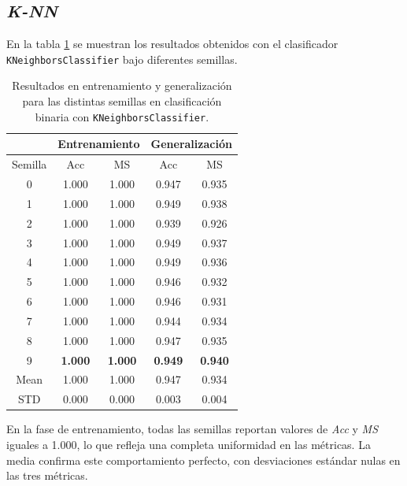 \subsection{\textit{K-NN}}
\label{subsec:knn_bin}

En la tabla \ref{tabla:knn_bin} se muestran los resultados obtenidos con el clasificador \texttt{KNeighborsClassifier} bajo diferentes semillas.

\begin{table}[H]
	\centering
	\begin{tabular}{ |c|c|c|c|c| }
		\hline
		\rowcolor{LightCyan}
		 & \multicolumn{2}{c|}{Entrenamiento} & \multicolumn{2}{c|}{Generalización} \\
		\hline
		\rowcolor{LightCyan}
		 Semilla & Acc & MS & Acc & MS \\
		\hline
		0    & 1.000          & 1.000          & 0.947          & 0.935          \\
		1    & 1.000          & 1.000          & 0.949          & 0.938          \\
		2    & 1.000          & 1.000          & 0.939          & 0.926          \\
		3    & 1.000          & 1.000          & 0.949          & 0.937          \\
		4    & 1.000          & 1.000          & 0.949          & 0.936          \\
		5    & 1.000          & 1.000          & 0.946          & 0.932          \\
		6    & 1.000          & 1.000          & 0.946          & 0.931          \\
		7    & 1.000          & 1.000          & 0.944          & 0.934          \\
		8    & 1.000          & 1.000          & 0.947          & 0.935          \\
		9    & \textbf{1.000} & \textbf{1.000} & \textbf{0.949} & \textbf{0.940} \\
		Mean & 1.000          & 1.000          & 0.947          & 0.934          \\
		STD  & 0.000          & 0.000          & 0.003          & 0.004          \\
		\hline
	\end{tabular}
	\caption{Resultados en entrenamiento y generalización para las distintas semillas en clasificación binaria con \texttt{KNeighborsClassifier}.}
	\label{tabla:knn_bin}
\end{table}

En la fase de entrenamiento, todas las semillas reportan valores de \textit{Acc} y \textit{MS} iguales a 1.000, lo que refleja una completa uniformidad en las métricas. La media confirma este comportamiento perfecto, con desviaciones estándar nulas en las tres métricas.

